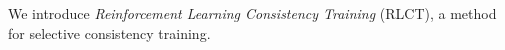 \documentclass{article}
\begin{document}
We introduce \emph{Reinforcement Learning Consistency Training} (RLCT),
a method for selective consistency training.




\end{document}
